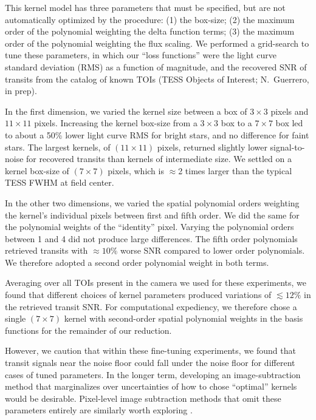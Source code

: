 \documentclass[12pt,twocolumn,tighten]{aastex62}
\begin{document}

This kernel model has three parameters that must be
specified, but are not automatically optimized by the procedure: (1) the box-size; 
(2) the maximum order of the polynomial weighting the delta
function terms; (3) the maximum order of the polynomial weighting the
flux scaling.  We performed a grid-search to tune these parameters, in
which our ``loss functions'' were the light curve standard deviation (RMS)
as a function of magnitude, and the recovered SNR of transits from the catalog
of known TOIs (TESS Objects of Interest; N.~Guerrero, in prep).

In the first dimension, we varied the kernel size between a box of
$3\times3$ pixels and $11\times11$ pixels.  Increasing the kernel
box-size from a $3\times3$ box to a $7\times7$ box led to about a 50\%
lower light curve RMS for bright stars, and no difference for faint
stars.  The largest kernels, of $(11\times11)$ pixels, returned
slightly lower signal-to-noise for recovered transits than kernels
of intermediate size.  We settled on a kernel box-size of $(7\times7)$
pixels, which is $\approx$2 times larger than the typical TESS FWHM
at field center. 

In the other two dimensions, we varied the spatial polynomial orders
weighting the kernel's individual pixels between first and fifth
order.  We did the same for the polynomial weights of the ``identity''
pixel.  Varying the polynomial orders between 1 and 4 did not produce
large differences.  The fifth order polynomials retrieved transits
with $\approx10\%$ worse SNR compared to lower order polynomials.  We
therefore adopted a second order polynomial weight in both terms.

Averaging over all TOIs present in the camera we used for these
experiments, we found that different choices of kernel parameters
produced variations of $\lesssim 12\%$ in the retrieved transit SNR.  
For computational expediency, we therefore chose a single $(7\times
7)$ kernel with second-order spatial polynomial weights in the basis
functions for the remainder of our reduction.

However, we caution that within these fine-tuning experiments, we
found that transit signals near the noise floor could fall under the
noise floor for different cases of tuned parameters.  In the longer
term, developing an image-subtraction method that marginalizes over
uncertainties of how to chose ``optimal'' kernels would be desirable.
Pixel-level image subtraction methods that omit these parameters
entirely are similarly worth exploring \citep{wang_pixel-level_2017}.
\end{document}
